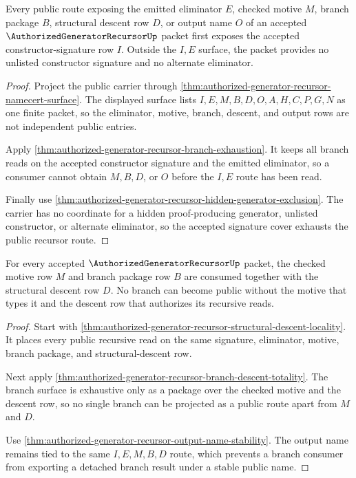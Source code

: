 \begin{theorem}
\label{thm:authorized-generator-recursor-accepted-signature-cover}
Every public route exposing the emitted eliminator $E$, checked motive $M$,
branch package $B$, structural descent row $D$, or output name $O$ of an
accepted $\AuthorizedGeneratorRecursorUp$ packet first exposes the accepted
constructor-signature row $I$. Outside the $I,E$ surface, the packet provides
no unlisted constructor signature and no alternate eliminator.
\end{theorem}
\begin{proof}
Project the public carrier through
\autoref{thm:authorized-generator-recursor-namecert-surface}. The displayed
surface lists $I,E,M,B,D,O,A,H,C,P,G,N$ as one finite packet, so the eliminator,
motive, branch, descent, and output rows are not independent public entries.

Apply \autoref{thm:authorized-generator-recursor-branch-exhaustion}. It keeps
all branch reads on the accepted constructor signature and the emitted
eliminator, so a consumer cannot obtain $M,B,D$, or $O$ before the $I,E$ route
has been read.

Finally use
\autoref{thm:authorized-generator-recursor-hidden-generator-exclusion}. The
carrier has no coordinate for a hidden proof-producing generator, unlisted
constructor, or alternate eliminator, so the accepted signature cover exhausts
the public recursor route.
\end{proof}

\begin{theorem}
\label{thm:authorized-generator-recursor-motive-branch-totality}
For every accepted $\AuthorizedGeneratorRecursorUp$ packet, the checked motive
row $M$ and branch package row $B$ are consumed together with the structural
descent row $D$. No branch can become public without the motive that types it
and the descent row that authorizes its recursive reads.
\end{theorem}
\begin{proof}
Start with
\autoref{thm:authorized-generator-recursor-structural-descent-locality}. It
places every public recursive read on the same signature, eliminator, motive,
branch package, and structural-descent row.

Next apply
\autoref{thm:authorized-generator-recursor-branch-descent-totality}. The branch
surface is exhaustive only as a package over the checked motive and the descent
row, so no single branch can be projected as a public route apart from $M$ and
$D$.

Use \autoref{thm:authorized-generator-recursor-output-name-stability}. The
output name remains tied to the same $I,E,M,B,D$ route, which prevents a branch
consumer from exporting a detached branch result under a stable public name.
\end{proof}

